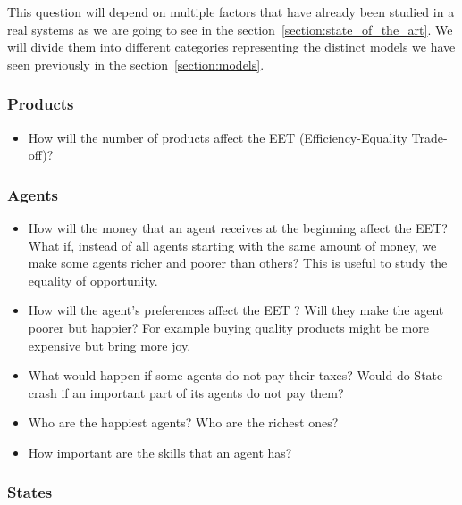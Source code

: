 \documentclass[12pt]{article}
\begin{document}
\vspace*{0.5cm}

This question will depend on multiple factors that have already been studied in a real systems as we are going to see in the  section~\ref{section:state_of_the_art}. We will divide them into different categories representing the distinct models we have seen previously in the section~\ref{section:models}. 

\subsubsection{Products}

\begin{itemize}
    \item How will the number of products affect the EET (Efficiency-Equality Trade-off)?
\end{itemize}


\subsubsection{Agents}

\begin{itemize}
    \item How will the money that an agent receives at the beginning affect the EET? What if, instead of all agents starting with the same amount of money, we make some agents richer and poorer than others? This is useful to study the equality of opportunity.
    \item How will the agent's preferences affect the EET ? Will they make the agent poorer but happier? For example buying quality products might be more expensive but bring more joy.
    \item What would happen if some agents do not pay their taxes? Would do State crash if an important part of its agents do not pay them?
    \item Who are the happiest agents? Who are the richest ones?
    \item How important are the skills that an agent has? 
\end{itemize}

\subsubsection{States}
\end{document}
